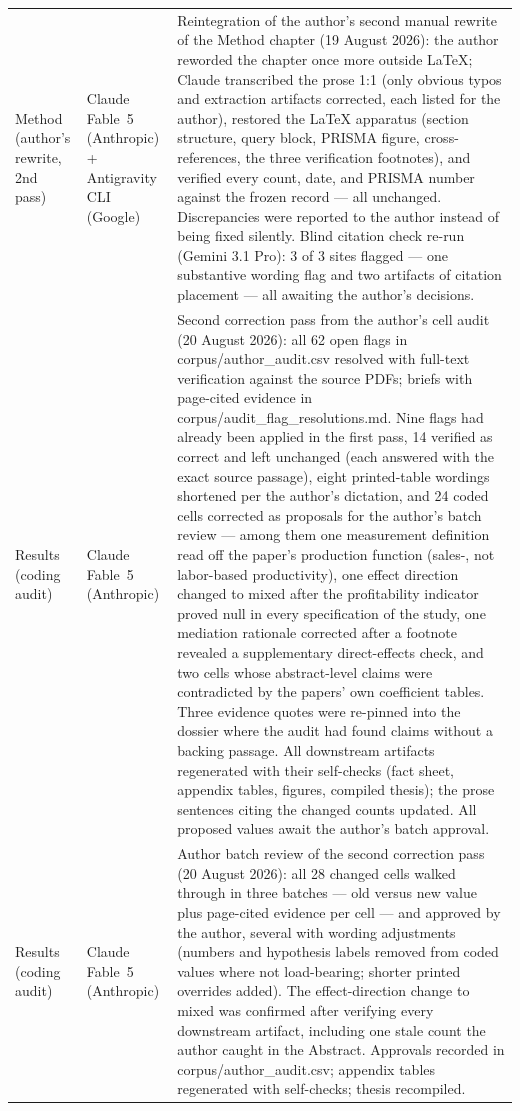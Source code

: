 \begin{longtable}{@{}p{2.9cm}p{3.2cm}p{9.0cm}@{}}
\addlinespace
Method (author's rewrite, 2nd pass) & Claude Fable~5 (Anthropic) + Antigravity CLI (Google) & Reintegration of the author's second manual rewrite of the Method chapter (19 August 2026): the author reworded the chapter once more outside LaTeX; Claude transcribed the prose 1:1 (only obvious typos and extraction artifacts corrected, each listed for the author), restored the LaTeX apparatus (section structure, query block, PRISMA figure, cross-references, the three verification footnotes), and verified every count, date, and PRISMA number against the frozen record --- all unchanged. Discrepancies were reported to the author instead of being fixed silently. Blind citation check re-run (Gemini 3.1 Pro): 3 of 3 sites flagged --- one substantive wording flag and two artifacts of citation placement --- all awaiting the author's decisions. \\
\addlinespace
Results (coding audit) & Claude Fable~5 (Anthropic) & Second correction pass from the author's cell audit (20 August 2026): all 62 open flags in corpus/author\_audit.csv resolved with full-text verification against the source PDFs; briefs with page-cited evidence in corpus/audit\_flag\_resolutions.md. Nine flags had already been applied in the first pass, 14 verified as correct and left unchanged (each answered with the exact source passage), eight printed-table wordings shortened per the author's dictation, and 24 coded cells corrected as proposals for the author's batch review --- among them one measurement definition read off the paper's production function (sales-, not labor-based productivity), one effect direction changed to mixed after the profitability indicator proved null in every specification of the study, one mediation rationale corrected after a footnote revealed a supplementary direct-effects check, and two cells whose abstract-level claims were contradicted by the papers' own coefficient tables. Three evidence quotes were re-pinned into the dossier where the audit had found claims without a backing passage. All downstream artifacts regenerated with their self-checks (fact sheet, appendix tables, figures, compiled thesis); the prose sentences citing the changed counts updated. All proposed values await the author's batch approval. \\
\addlinespace
Results (coding audit) & Claude Fable~5 (Anthropic) & Author batch review of the second correction pass (20 August 2026): all 28 changed cells walked through in three batches --- old versus new value plus page-cited evidence per cell --- and approved by the author, several with wording adjustments (numbers and hypothesis labels removed from coded values where not load-bearing; shorter printed overrides added). The effect-direction change to mixed was confirmed after verifying every downstream artifact, including one stale count the author caught in the Abstract. Approvals recorded in corpus/author\_audit.csv; appendix tables regenerated with self-checks; thesis recompiled. \\
\end{longtable}
